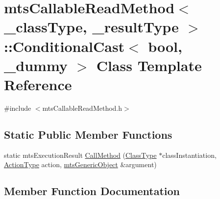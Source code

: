 \hypertarget{classmts_callable_read_method_1_1_conditional_cast}{}\section{mts\+Callable\+Read\+Method$<$ \+\_\+class\+Type, \+\_\+result\+Type $>$\+:\+:Conditional\+Cast$<$ bool, \+\_\+dummy $>$ Class Template Reference}
\label{classmts_callable_read_method_1_1_conditional_cast}


{\ttfamily \#include $<$mts\+Callable\+Read\+Method.\+h$>$}

\subsection*{Static Public Member Functions}
\begin{DoxyCompactItemize}
\item 
static mts\+Execution\+Result \hyperlink{classmts_callable_read_method_1_1_conditional_cast_aeb1f85e7fc92ca13e6c54c5d16d96399}{Call\+Method} (\hyperlink{classmts_callable_read_method_a44650138085a29d60a4f3cb3616abbbf}{Class\+Type} $\ast$class\+Instantiation, \hyperlink{classmts_callable_read_method_a9e05546d6f486e77f1df0c2b079dd7e1}{Action\+Type} action, \hyperlink{classmts_generic_object}{mts\+Generic\+Object} \&argument)
\end{DoxyCompactItemize}


\subsection{Member Function Documentation}
\hypertarget{classmts_callable_read_method_1_1_conditional_cast_aeb1f85e7fc92ca13e6c54c5d16d96399}{}
